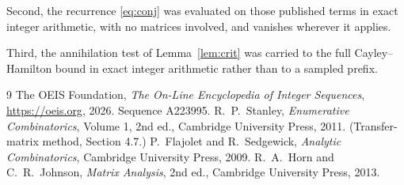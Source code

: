 \documentclass[11pt,a4paper]{article}
\theoremstyle{plain}
\theoremstyle{definition}
\begin{document}
Second, the recurrence \eqref{eq:conj} was evaluated on those published terms in exact
integer arithmetic, with no matrices involved, and vanishes wherever it applies.

Third, the annihilation test of Lemma~\ref{lem:crit} was carried to the full
Cayley--Hamilton bound in exact integer arithmetic rather than to a sampled prefix.

\begin{thebibliography}{9}
 The OEIS Foundation, \emph{The On-Line Encyclopedia of Integer
Sequences}, \url{https://oeis.org}, 2026. Sequence A223995.
 R.~P.~Stanley, \emph{Enumerative Combinatorics}, Volume 1, 2nd ed.,
Cambridge University Press, 2011. (Transfer-matrix method, Section 4.7.)
 P.~Flajolet and R.~Sedgewick, \emph{Analytic Combinatorics}, Cambridge
University Press, 2009.
 R.~A.~Horn and C.~R.~Johnson, \emph{Matrix Analysis}, 2nd ed., Cambridge
University Press, 2013.
\end{thebibliography}
\end{document}
